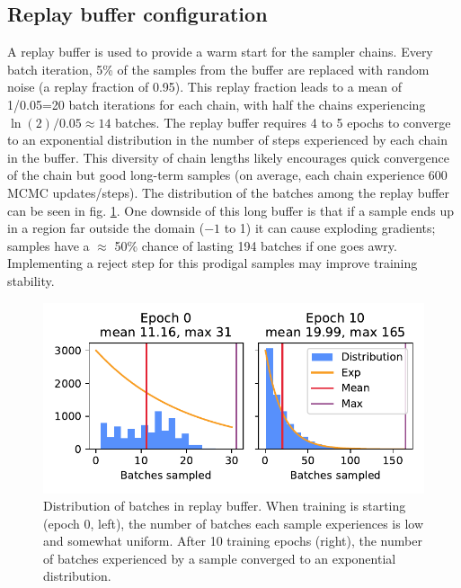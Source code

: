 \subsection{Replay buffer configuration}
A replay buffer is used to provide a warm start for the sampler chains. Every batch iteration, 5\% of the samples from the buffer are replaced with random noise (a replay fraction of 0.95). This replay fraction leads to a mean of 1/0.05=20 batch iterations for each chain, with half the chains experiencing $\ln(2)/0.05 \approx 14$ batches. The replay buffer requires 4 to 5 epochs to converge to an exponential distribution in the number of steps experienced by each chain in the buffer. This diversity of chain lengths likely encourages quick convergence of the chain but good long-term samples (on average, each chain experience 600 MCMC updates/steps). The distribution of the batches among the replay buffer can be seen in fig. \ref{fig:buffer_distribution}. One downside of this long buffer is that if a sample ends up in a region far outside the domain ($-1$ to 1) it can cause exploding gradients; samples have a $\approx$ 50\% chance of lasting 194 batches if one goes awry. Implementing a reject step for this prodigal samples may improve training stability. 

\begin{figure}
	\centering
	\includegraphics[width=350pt]{figures/buffer_distributions.pdf}
	\caption[Distribution of batches in replay buffer samples]{\label{fig:buffer_distribution}Distribution of batches in replay buffer. When training is starting (epoch 0, left), the number of batches each sample experiences is low and somewhat uniform. After 10 training epochs (right), the number of batches experienced by a sample converged to an exponential distribution.}
\end{figure}

